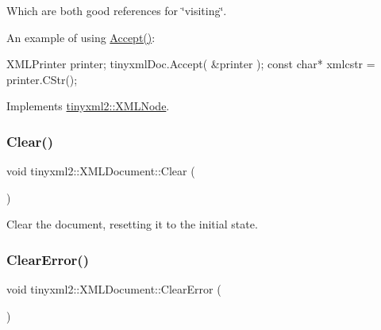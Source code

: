 Which are both good references for \char`\"{}visiting\char`\"{}.

An example of using \hyperlink{classtinyxml2_1_1_x_m_l_document_ab7be651917a35ab1ff0e4e6d4e565cdf}{Accept()}\+: \begin{DoxyVerb}XMLPrinter printer;
tinyxmlDoc.Accept( &printer );
const char* xmlcstr = printer.CStr();
\end{DoxyVerb}
 

Implements \hyperlink{classtinyxml2_1_1_x_m_l_node_a81e66df0a44c67a7af17f3b77a152785}{tinyxml2\+::\+X\+M\+L\+Node}.

\mbox{\label{classtinyxml2_1_1_x_m_l_document_a65656b0b2cbc822708eb351504178aaf}} 
\subsubsection{\texorpdfstring{Clear()}{Clear()}}
{\footnotesize\ttfamily void tinyxml2\+::\+X\+M\+L\+Document\+::\+Clear (\begin{DoxyParamCaption}{ }\end{DoxyParamCaption})}



Clear the document, resetting it to the initial state. 

\mbox{\label{classtinyxml2_1_1_x_m_l_document_a4085d9c52f1d93214311459d6d1fcf17}} 
\subsubsection{\texorpdfstring{Clear\+Error()}{ClearError()}}
{\footnotesize\ttfamily void tinyxml2\+::\+X\+M\+L\+Document\+::\+Clear\+Error (\begin{DoxyParamCaption}{ }\end{DoxyParamCaption})\hspace{0.3cm}{\ttfamily [inline]}}

\mbox{\label{classtinyxml2_1_1_x_m_l_document_ac1d6e2c7fcc1a660624ac4f68e96380d}} 
